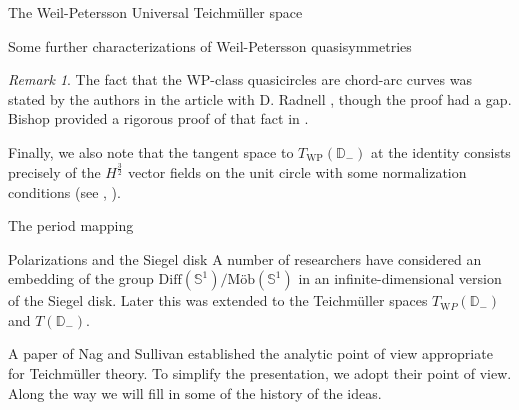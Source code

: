 \documentclass[12pt]{amsart}
\newcommand{\disk}{\ensuremath{\mathbb{D}} } %
\theoremstyle{plain}
\theoremstyle{definition}
\theoremstyle{remark}
\newtheorem{remark}[theorem]{Remark}
\numberwithin{equation}{section} %
\numberwithin{figure}{section} %
\begin{document}
\begin{section}{The Weil-Petersson Universal Teichm\"uller space}
\begin{subsection}{Some further characterizations of Weil-Petersson quasisymmetries}
{\begin{remark}
    The fact that the WP-class quasicircles are chord-arc curves was stated by the authors in the article with D. Radnell \cite{RSS_WP_multiply}, though the proof had a gap. Bishop provided a rigorous proof of that fact in \cite{Bishop1}. 
\end{remark}}

Finally, we also note that the tangent space to \(T_{\mathrm{WP}}(\mathbb{D}_-)\) at the identity consists precisely of the \(H^{\frac{3}{2}}\) vector fields on the unit circle with some normalization conditions (see \cite{NagVerjovsky}, \cite{Takhtajan_Teo_Memoirs}).

\end{subsection} 

\end{section}
\begin{section}{The period mapping}  \label{se:period}  
\begin{subsection}{Polarizations and the Siegel disk} \label{se:polarizations_Siegel} 
  A number of researchers have considered an embedding of the group $\text{Diff}(\mathbb{S}^1)/\text{M\"ob}(\mathbb{S}^1)$ in an infinite-dimensional version of the Siegel disk. Later this was extended to 
  the Teichm\"uller spaces $T_{\mathrm WP}(\disk_-)$ and $T(\disk_-)$.
  
  A paper of Nag and Sullivan established the analytic point of view appropriate for Teichm\"uller theory. To simplify the presentation, we adopt their point of view. Along the way we will fill in some of the history of the ideas.
  

\end{subsection}
\end{section}
\end{document}
